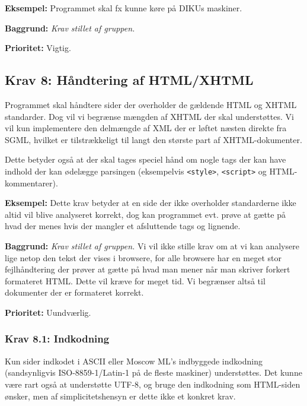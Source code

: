 \documentclass[a4paper,oneside,article, titlepage]{article}
\begin{document}
\begin{description}
\item \textbf{Eksempel:} Programmet skal fx kunne køre på DIKUs maskiner.

\item \textbf{Baggrund:} \textit{Krav stillet af gruppen.} 
\item \textbf{Prioritet:} Vigtig.
\end{description}

\subsection{Krav 8: Håndtering af HTML/XHTML}
Programmet skal håndtere sider der overholder de gældende HTML
og XHTML standarder. Dog vil vi begrænse mængden af XHTML der skal
understøttes. Vi vil kun implementere den delmængde af XML der er
løftet næsten direkte fra SGML, hvilket er tilstrækkeligt til langt
den største part af XHTML-dokumenter.

Dette betyder også at der skal tages speciel hånd om nogle tags der
kan have indhold der kan ødelægge parsingen (eksempelvis
\texttt{<style>}, \texttt{<script>} og HTML-kommentarer).

\begin{description}
\item \textbf{Eksempel:} Dette krav betyder at en side der ikke
  overholder standarderne ikke altid vil blive analyseret korrekt, dog
  kan programmet evt. prøve at gætte på hvad der menes hvis der
  mangler et afsluttende tags og lignende.

\item \textbf{Baggrund:} \textit{Krav stillet af gruppen.} Vi vil ikke
  stille krav om at vi kan analysere lige netop den tekst der vises i
  browsere, for alle browsere har en meget stor fejlhåndtering der
  prøver at gætte på hvad man mener når man skriver forkert formateret
  HTML. Dette vil kræve for meget tid. Vi begrænser altså til
  dokumenter der er formateret korrekt.
\item \textbf{Prioritet:} Uundværlig.
\end{description}


\subsubsection{Krav 8.1: Indkodning}
Kun sider indkodet i ASCII eller Moscow ML's indbyggede indkodning
(sandsynligvis ISO-8859-1/Latin-1 på de fleste maskiner)
understøttes. Det kunne være rart også at understøtte UTF-8, og bruge
den indkodning som HTML-siden ønsker, men af simplicitetshensyn er
dette ikke et konkret krav.
\end{document}
